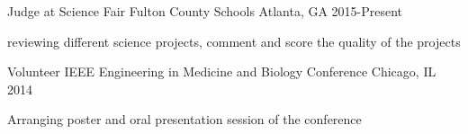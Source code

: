 \begin{cventries}
    \cventry
    {Judge at Science Fair}
    {Fulton County Schools}
    {Atlanta, GA}
    {2015-Present}
    {
      \begin{cvitems}
        \item {reviewing different science projects, comment and score the quality of the projects}
      \end{cvitems}
    }
    \cventry
    {Volunteer}
    {IEEE Engineering in Medicine and Biology Conference}
    {Chicago, IL}
    {2014}
    {
      \begin{cvitems}
        \item {Arranging poster and oral presentation session of the conference}
      \end{cvitems}
    }
\end{cventries}
